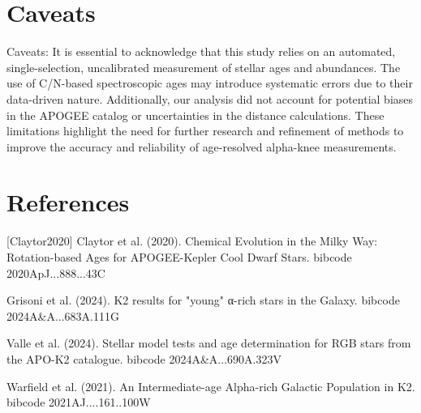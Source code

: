 \documentclass[twocolumn]{aastex631}
\begin{document}
\section{Caveats}
Caveats:
It is essential to acknowledge that this study relies on an automated, single-selection, uncalibrated measurement of stellar ages and abundances. The use of C/N-based spectroscopic ages may introduce systematic errors due to their data-driven nature. Additionally, our analysis did not account for potential biases in the APOGEE catalog or uncertainties in the distance calculations. These limitations highlight the need for further research and refinement of methods to improve the accuracy and reliability of age-resolved alpha-knee measurements.
\section*{References}
\footnotesize
[Claytor2020] Claytor et al. (2020). Chemical Evolution in the Milky Way: Rotation-based Ages for APOGEE-Kepler Cool Dwarf Stars. bibcode 2020ApJ...888...43C \par [Grisoni2024] Grisoni et al. (2024). K2 results for "young" α-rich stars in the Galaxy. bibcode 2024A\&A...683A.111G \par [Valle2024] Valle et al. (2024). Stellar model tests and age determination for RGB stars from the APO-K2 catalogue. bibcode 2024A\&A...690A.323V \par [Warfield2021] Warfield et al. (2021). An Intermediate-age Alpha-rich Galactic Population in K2. bibcode 2021AJ....161..100W
\end{document}
